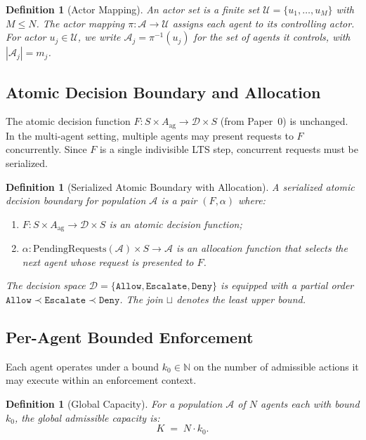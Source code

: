 \documentclass[11pt]{article}
\newtheorem{definition}[theorem]{Definition}
\newcommand{\allow}{\texttt{Allow}}
\newcommand{\deny}{\texttt{Deny}}
\newcommand{\escalate}{\texttt{Escalate}}
\newcommand{\Agents}{\mathcal{A}}
\newcommand{\Actors}{\mathcal{U}}
\newcommand{\join}{\sqcup}
\newcommand{\Dec}{\mathcal{D}}
\newcommand{\kbound}{k_0}
\newcommand{\Kcap}{K}
\begin{document}
\begin{definition}[Actor Mapping]
\label{def:actors}
An \emph{actor set} is a finite set $\Actors = \{u_1, \ldots, u_M\}$ with $M \leq N$. The \emph{actor mapping} $\pi : \Agents \to \Actors$ assigns each agent to its controlling actor. For actor $u_j \in \Actors$, we write $\Agents_j = \pi^{-1}(u_j)$ for the set of agents it controls, with $|\Agents_j| = m_j$.
\end{definition}

\subsection{Atomic Decision Boundary and Allocation}

The atomic decision function $F : S \times A_{\mathrm{ag}} \to \Dec \times S$ (from Paper~0) is unchanged. In the multi-agent setting, multiple agents may present requests to $F$ concurrently. Since $F$ is a single indivisible LTS step, concurrent requests must be serialized.

\begin{definition}[Serialized Atomic Boundary with Allocation]
\label{def:serial-alloc}
A \emph{serialized atomic decision boundary} for population $\Agents$ is a pair $(F, \alpha)$ where:
\begin{enumerate}[label=(\roman*)]
  \item $F : S \times A_{\mathrm{ag}} \to \Dec \times S$ is an atomic decision function;
  \item $\alpha : \mathrm{PendingRequests}(\Agents) \times S \to \Agents$ is an \emph{allocation function} that selects the next agent whose request is presented to $F$.
\end{enumerate}
The decision space $\Dec = \{\allow, \escalate, \deny\}$ is equipped with a partial order $\allow \prec \escalate \prec \deny$. The join $\join$ denotes the least upper bound.
\end{definition}

\subsection{Per-Agent Bounded Enforcement}

Each agent operates under a bound $\kbound \in \mathbb{N}$ on the number of admissible actions it may execute within an enforcement context.

\begin{definition}[Global Capacity]
\label{def:globalcap}
For a population $\Agents$ of $N$ agents each with bound $\kbound$, the \emph{global admissible capacity} is:
\[
  \Kcap \;=\; N \cdot \kbound.
\]
\end{definition}
\end{document}
